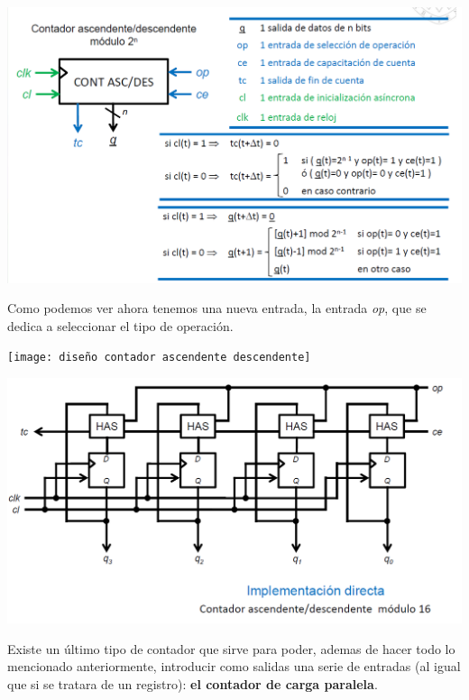 \documentclass[a4paper,10pt]{book}
\begin{document}
\begin{center}
\includegraphics[scale=0.42]{contador ascendente descendente}
\end{center}

Como podemos ver ahora tenemos una nueva entrada, la entrada \textit{op}, que se dedica a seleccionar el tipo de operación.

\begin{center}
\texttt{[image: diseño contador ascendente descendente]}
\end{center}

\begin{center}
\includegraphics[scale=0.42]{implementacion contador ascendente descendente}
\end{center}

Existe un último tipo de contador que sirve para poder, ademas de hacer todo lo mencionado anteriormente, introducir como salidas una serie de entradas (al igual que si se tratara de un registro): \textbf{el contador de carga paralela}.
\end{document}
